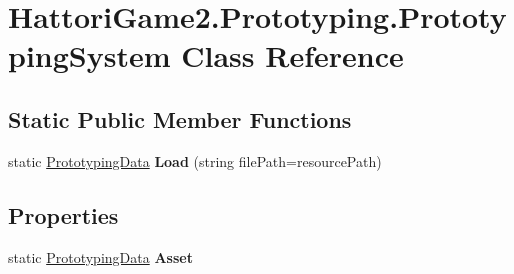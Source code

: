 \hypertarget{class_hattori_game2_1_1_prototyping_1_1_prototyping_system}{}\section{Hattori\+Game2.\+Prototyping.\+Prototyping\+System Class Reference}
\label{class_hattori_game2_1_1_prototyping_1_1_prototyping_system}
\subsection*{Static Public Member Functions}
\begin{DoxyCompactItemize}
\item 
\hypertarget{class_hattori_game2_1_1_prototyping_1_1_prototyping_system_aa029f2b931a987ee5c06455a07ebc011}{}static \hyperlink{class_hattori_game2_1_1_prototyping_1_1_prototyping_data}{Prototyping\+Data} {\bfseries Load} (string file\+Path=resource\+Path)\label{class_hattori_game2_1_1_prototyping_1_1_prototyping_system_aa029f2b931a987ee5c06455a07ebc011}

\end{DoxyCompactItemize}
\subsection*{Properties}
\begin{DoxyCompactItemize}
\item 
\hypertarget{class_hattori_game2_1_1_prototyping_1_1_prototyping_system_a5f3078cb95a9c7c9cc7ea6859104e980}{}static \hyperlink{class_hattori_game2_1_1_prototyping_1_1_prototyping_data}{Prototyping\+Data} {\bfseries Asset}\label{class_hattori_game2_1_1_prototyping_1_1_prototyping_system_a5f3078cb95a9c7c9cc7ea6859104e980}

\end{DoxyCompactItemize}
